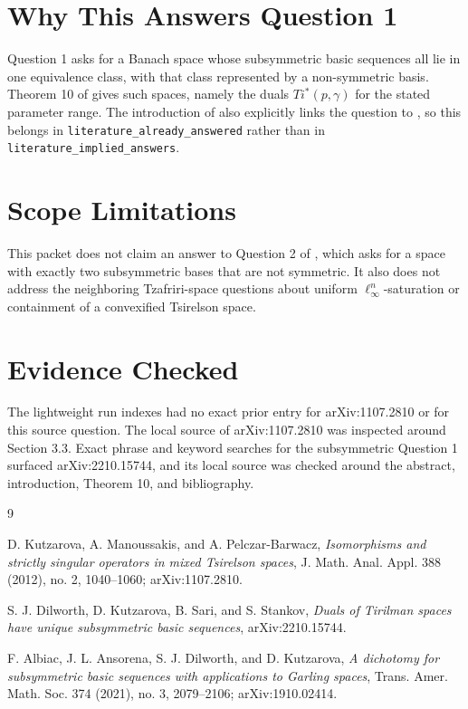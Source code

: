 \documentclass[11pt]{article}
\begin{document}
\section*{Why This Answers Question 1}

Question 1 asks for a Banach space whose subsymmetric basic sequences all lie
in one equivalence class, with that class represented by a non-symmetric
basis. Theorem 10 of \cite{DKSS} gives such spaces, namely the duals
\(Ti^*(p,\gamma)\) for the stated parameter range. The introduction of
\cite{DKSS} also explicitly links the question to \cite{KMP}, so this belongs
in \texttt{literature\_already\_answered} rather than in
\texttt{literature\_implied\_answers}.

\section*{Scope Limitations}

This packet does not claim an answer to Question 2 of \cite{KMP}, which asks
for a space with exactly two subsymmetric bases that are not symmetric. It also
does not address the neighboring Tzafriri-space questions about uniform
\(\ell_\infty^n\)-saturation or containment of a convexified Tsirelson space.

\section*{Evidence Checked}

The lightweight run indexes had no exact prior entry for arXiv:1107.2810 or
for this source question. The local source of arXiv:1107.2810 was inspected
around Section 3.3. Exact phrase and keyword searches for the subsymmetric
Question 1 surfaced arXiv:2210.15744, and its local source was checked around
the abstract, introduction, Theorem 10, and bibliography.

\begin{thebibliography}{9}

D. Kutzarova, A. Manoussakis, and A. Pelczar-Barwacz,
\emph{Isomorphisms and strictly singular operators in mixed Tsirelson spaces},
J. Math. Anal. Appl. 388 (2012), no. 2, 1040--1060; arXiv:1107.2810.

S. J. Dilworth, D. Kutzarova, B. Sari, and S. Stankov,
\emph{Duals of Tirilman spaces have unique subsymmetric basic sequences},
arXiv:2210.15744.

F. Albiac, J. L. Ansorena, S. J. Dilworth, and D. Kutzarova,
\emph{A dichotomy for subsymmetric basic sequences with applications to
Garling spaces}, Trans. Amer. Math. Soc. 374 (2021), no. 3, 2079--2106;
arXiv:1910.02414.

\end{thebibliography}
\end{document}
